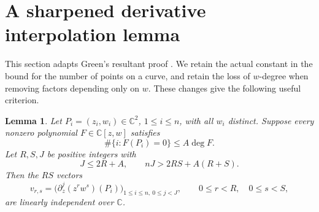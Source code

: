 \documentclass[11pt]{article}
\newtheorem{lemma}[theorem]{Lemma}
\newcommand{\C}{\mathbb C}
\begin{document}
\section{A sharpened derivative interpolation lemma}\label{rank}

This section adapts Green's resultant proof \cite{green}. We retain the
actual constant in the bound for the number of points on a curve, and
retain the loss of \(w\)-degree when removing factors depending only on
\(w\). These changes give the following useful criterion.

\begin{lemma}\label{rank-lemma}
Let \(P_i=(z_i,w_i)\in\C^2\), \(1\le i\le n\), with all \(w_i\)
distinct. Suppose every nonzero polynomial \(F\in\C[z,w]\) satisfies
\[
 \#\{i:F(P_i)=0\}\le A\deg F.
\]
Let \(R,S,J\) be positive integers with
\begin{equation}\label{rank-condition}
 J\le2R+A,\qquad nJ>2RS+A(R+S).
\end{equation}
Then the \(RS\) vectors
\[
 v_{r,s}=\bigl(\partial_z^j(z^r w^s)(P_i)\bigr)_{
                 1\le i\le n,\ 0\le j<J},
 \qquad0\le r<R,\quad0\le s<S,
\]
are linearly independent over \(\C\).
\end{lemma}
\end{document}
